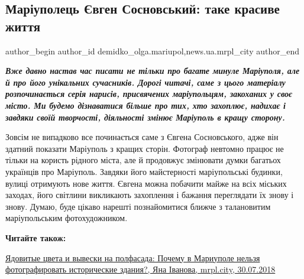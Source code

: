  
 
 
 
 
 
\subsection{Маріуполець Євген Сосновський: таке красиве життя}
\label{sec:19_01_2019.stz.news.ua.mrpl_city.1.sosnovsky_take_krasyve_zhyttja}
 
\ifcmt
 author_begin
   author_id demidko_olga.mariupol,news.ua.mrpl_city
 author_end
\fi

\begin{center}
\color{blue}\em
\textbf{Вже давно настав час писати не тільки про багате минуле Маріуполя, але й про
його унікальних сучасників. Дорогі читачі, саме з цього матеріалу
розпочинається серія нарисів, присвячених маріупольцям, закоханих у своє місто.
Ми будемо дізнаватися більше про тих, хто захоплює, надихає і завдяки своїй
творчості, діяльності змінює Маріуполь в кращу сторону.}
\end{center}

Зовсім не випадково все починається саме з Євгена Сосновського, адже він
здатний показати Маріуполь з кращих сторін. Фотограф невтомно працює не тільки
на користь рідного міста, але й продовжує змінювати думки багатьох українців
про Маріуполь. Завдяки його майстерності маріупольські будинки, вулиці
отримують нове життя. Євгена можна побачити майже на всіх міських заходах, його
світлини викликають захоплення і бажання переглядати їх знову і знову. Думаю,
буде цікаво нарешті познайомитися ближче з талановитим маріупольським
фотохудожником.

\textbf{Читайте також:} 

\href{https://mrpl.city/news/view/yadovitye-tsveta-i-vyveski-na-polfasada-pochemu-v-mariupole-nelzya-fotografirovat-istoricheskie-zdaniya-foto}{%
Ядовитые цвета и вывески на полфасада: Почему в Мариуполе нельзя фотографировать исторические здания?, %
Яна Іванова, mrpl.city, 30.07.2018%
}

